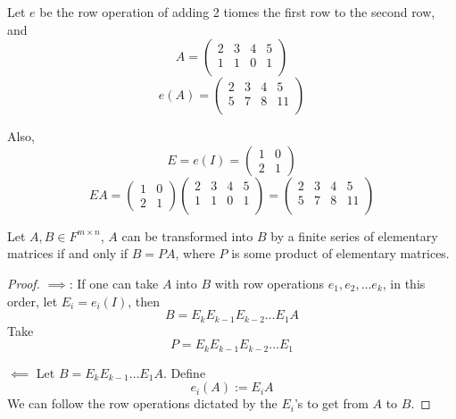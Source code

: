 \begin{example}
    Let $e$ be the row operation of adding 2 tiomes the first row to the second row, and 
    \[
        A = \begin{pmatrix} 
          2 & 3 & 4 & 5 \\  
          1 & 1 & 0 & 1 \\  
        \end{pmatrix}
    \]
    \[
        e(A) = \begin{pmatrix} 
          2 & 3 & 4 & 5 \\  
          5 & 7 & 8 & 11 \\  
        \end{pmatrix}
    \]

    Also, 
    \[
        E = e(I) = \begin{pmatrix} 1 & 0 \\ 2 & 1 \end{pmatrix} 
    \]
    \[
        EA =  \begin{pmatrix} 1 & 0 \\ 2 & 1 \end{pmatrix} \begin{pmatrix} 
          2 & 3 & 4 & 5 \\  
          1 & 1 & 0 & 1 \\  
        \end{pmatrix} = 
        \begin{pmatrix} 
          2 & 3 & 4 & 5 \\  
          5 & 7 & 8 & 11 \\  
        \end{pmatrix}
    \]
\end{example}

\begin{corollary}
    Let $A, B \in F^{m \times n}$, $A$ can be transformed into $B$ by a finite series of elementary matrices if and only if $B = PA$, where $P$ is some product of elementary matrices. 
\end{corollary}

\begin{proof}
    $\implies$: If one can take $A$ into $B$ with row operations $e_1, e_2, \hdots e_k$, in this order, let $E_i = e_i (I)$, then 
    \[
        B = E_k E_{k - 1} E_{k - 2} \hdots E_1 A
    \]
    Take 
    \[
        P = E_k E_{k - 1} E_{k - 2} \hdots E_1
    \]

    $\impliedby$ Let $B = E_k E_{k - 1} \hdots E_1 A$. Define 
    \[
        e_i(A) := E_i A
    \]
    We can follow the row operations dictated by the $E_i$'s to get from $A$ to $B$.
\end{proof}

